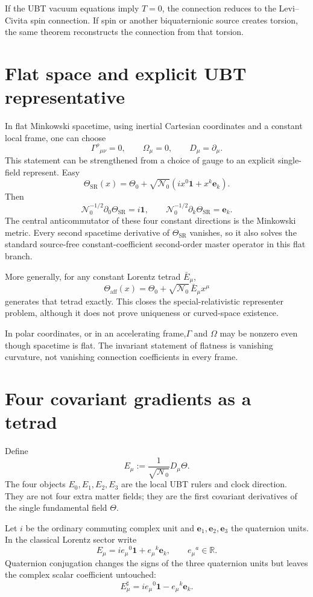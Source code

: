 If the UBT vacuum equations imply $T=0$, the connection reduces to the
Levi--Civita spin connection.  If spin or another biquaternionic source creates
torsion, the same theorem reconstructs the connection from that torsion.

\section{Flat space and explicit UBT representative}
In flat Minkowski spacetime, using inertial Cartesian coordinates and a constant
local frame, one can choose
\[
 \Gamma^\rho{}_{\mu\nu}=0,
 \qquad \Omega_\mu=0,
 \qquad D_\mu=\partial_\mu.
\]
This statement can be strengthened from a choice of gauge to an explicit
single-field represent.  Easy
\[
 \boxed{
 \Theta_{\mathrm{SR}}(x)=\Theta_0+\sqrt{\mathcal N_0}
 \left(i x^0\mathbf1+x^k\mathbf e_k\right).}
\]
Then
\[
 \mathcal N_0^{-1/2}\partial_0\Theta_{\mathrm{SR}}=i\mathbf1,
 \qquad
 \mathcal N_0^{-1/2}\partial_k\Theta_{\mathrm{SR}}=\mathbf e_k.
\]
The central anticommutator of these four constant directions is the Minkowski
metric.  Every second spacetime derivative of $\Theta_{\mathrm{SR}}$ vanishes,
so it also solves the standard source-free constant-coefficient second-order
master operator in this flat branch.

More generally, for any constant Lorentz tetrad $\bar E_\mu$,
\[
 \Theta_{\mathrm{aff}}(x)=\Theta_0+
 \sqrt{\mathcal N_0}\,\bar E_\mu x^\mu
\]
generates that tetrad exactly.  This closes the special-relativistic
representer problem, although it does not prove uniqueness or curved-space
existence.

In polar coordinates, or in an accelerating frame,$\Gamma$ and $\Omega$ may
be nonzero even though spacetime is flat.  The invariant statement of flatness
is vanishing curvature, not vanishing connection coefficients in every frame.

\section{Four covariant gradients as a tetrad}
Define
\[
 E_\mu:=\frac{1}{\sqrt{\mathcal N_0}}D_\mu\Theta.
\]
The four objects $E_0,E_1,E_2,E_3$ are the local UBT rulers and clock direction.
They are not four extra matter fields; they are the first covariant derivatives
of the single fundamental field $\Theta$.

Let $i$ be the ordinary commuting complex unit and
$\mathbf e_1,\mathbf e_2,\mathbf e_3$ the quaternion units.  In the classical
Lorentz sector write
\[
 E_\mu=i e_\mu{}^0\mathbf1+e_\mu{}^k\mathbf e_k,
 \qquad e_\mu{}^a\in\mathbb R.
\]
Quaternion conjugation changes the signs of the three quaternion units but
leaves the complex scalar coefficient untouched:
\[
 E_\mu^\sharp=i e_\mu{}^0\mathbf1-e_\mu{}^k\mathbf e_k.
\]

